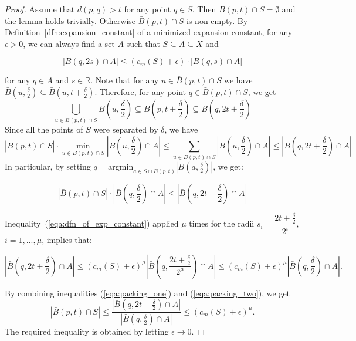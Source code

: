 \documentclass[a4paper,UKenglish,cleveref, autoref]{lipics-v2019}
\numberwithin{algocf}{section}
\theoremstyle{definition}
\theoremstyle{definition}
\theoremstyle{definition}
\theoremstyle{plain}
\newcommand{\R}{\mathbb{R}}
\begin{document}
\lempacking*
\begin{proof}
Assume that $d(p,q) > t$ for any point $q \in S$. 
Then $\bar{B}(p, t) \cap S = \emptyset$ and the lemma holds trivially. Otherwise $\bar{B}(p, t) \cap S$ is non-empty. 
By Definition~\ref{dfn:expansion_constant} of a minimized expansion constant, for any $\epsilon > 0$, we can always find a set $A$ such that $S \subseteq A \subseteq X$ and
\begin{ceqn}
\begin{equation}
\label{eqa:dfn_of_exp_constant}
|B(q,2s) \cap A| \leq (c_m(S) + \epsilon) \cdot | B(q,s) \cap A|
\end{equation}
\end{ceqn}
for any $q \in A$ and $s \in \R$. Note that for any $u \in \bar{B}(p,t) \cap S$ we have $\bar{B}(u, \frac{\delta}{2}) \subseteq  \bar{B}(u, t + \frac{\delta}{2})$. 
Therefore, for any point $q \in \bar{B}(p,t) \cap S$, we get
$$\bigcup_{u \in \bar{B}(p, t) \cap S}\bar{B}(u, \frac{\delta}{2}) \subseteq  \bar{B}(p,t + \frac{\delta}{2}) \subseteq \bar{B}(q, 2t +  \frac{\delta}{2})$$
Since all the points of $S$ were separated by $\delta$, we have
\begin{equation*}
\label{eqa:packing_zero}
| \bar{B}(p, t) \cap S| \cdot \min_{u \in \bar{B}(p, t) \cap S}| \bar{B}(u, \frac{\delta}{2}) \cap A|  \leq \sum_{u \in \bar{B}(p, t) \cap S} | \bar{B}(u, \frac{\delta}{2}) \cap A |\leq | \bar{B}(q, 2t + \frac{\delta}{2}) \cap A |
\end{equation*}
In particular, by setting $q = \mathrm{argmin}_{a \in S \cap \bar{B}(p,t)}| \bar{B}(a, \frac{\delta}{2})|$, we get:
\begin{ceqn}
\begin{equation}
\label{eqa:packing_one}
| \bar{B}(p, t) \cap S| \cdot |  \bar{B}(q, \frac{\delta}{2}) \cap A| \leq | \bar{B}(q, 2t + \frac{\delta}{2}) \cap A |
\end{equation}
\end{ceqn}
Inequality~(\ref{eqa:dfn_of_exp_constant}) applied $\mu$ times 
for the radii $s_i = \dfrac{2t + \frac{\delta}{2}}{2^{i}} $, $i = 1,...,\mu$, implies that:
\begin{ceqn}
\begin{equation} 
\label{eqa:packing_two}
 |\bar{B}(q,2t + \frac{\delta}{2}) \cap A| \leq (c_m(S) + \epsilon)^{\mu}|\bar{B}(q, \dfrac{2t + \frac{\delta}{2}}{2^{ \mu}}) \cap A |  \leq  (c_m(S) + \epsilon)^{ \mu}|\bar{B}(q, \frac{\delta}{2}) \cap A|. 
\end{equation}
\end{ceqn}
By combining inequalities (\ref{eqa:packing_one}) and (\ref{eqa:packing_two}), we get
$$| \bar{B}(p,t) \cap S  |\leq \dfrac{|\bar{B}(q, 2t + \frac{\delta}{2})  \cap A |}{|\bar{B}(q, \frac{\delta}{2})  \cap A|} \leq (c_m(S)+\epsilon)^{\mu}.$$
The required inequality is obtained by letting $\epsilon \rightarrow 0$.\end{proof}
\end{document}
